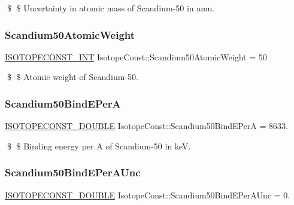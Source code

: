 \$ \$ Uncertainty in atomic mass of Scandium-\/50 in amu. \mbox{\label{group___isotope_const-_scandium-_sc50_ga93b40f5ab640872362070074bba73ca3}} 
\subsubsection{\texorpdfstring{Scandium50\+Atomic\+Weight}{Scandium50AtomicWeight}}
{\footnotesize\ttfamily \mbox{\hyperlink{group___isotope_const-_macros_ga5f18360b3e99483a35c32d789e62621c}{I\+S\+O\+T\+O\+P\+E\+C\+O\+N\+S\+T\+\_\+\+I\+NT}} Isotope\+Const\+::\+Scandium50\+Atomic\+Weight = 50}

\$ \$ Atomic weight of Scandium-\/50. \mbox{\label{group___isotope_const-_scandium-_sc50_gab37ecd7379fb1a78dd1f5520ce85054b}} 
\subsubsection{\texorpdfstring{Scandium50\+Bind\+E\+PerA}{Scandium50BindEPerA}}
{\footnotesize\ttfamily \mbox{\hyperlink{group___isotope_const-_macros_ga8f45a7272ce02c0b4c65c44636ed719a}{I\+S\+O\+T\+O\+P\+E\+C\+O\+N\+S\+T\+\_\+\+D\+O\+U\+B\+LE}} Isotope\+Const\+::\+Scandium50\+Bind\+E\+PerA = 8633.}

\$ \$ Binding energy per A of Scandium-\/50 in keV. \mbox{\label{group___isotope_const-_scandium-_sc50_gaa9a67dc81960282581edafb930ed69f4}} 
\subsubsection{\texorpdfstring{Scandium50\+Bind\+E\+Per\+A\+Unc}{Scandium50BindEPerAUnc}}
{\footnotesize\ttfamily \mbox{\hyperlink{group___isotope_const-_macros_ga8f45a7272ce02c0b4c65c44636ed719a}{I\+S\+O\+T\+O\+P\+E\+C\+O\+N\+S\+T\+\_\+\+D\+O\+U\+B\+LE}} Isotope\+Const\+::\+Scandium50\+Bind\+E\+Per\+A\+Unc = 0.}

